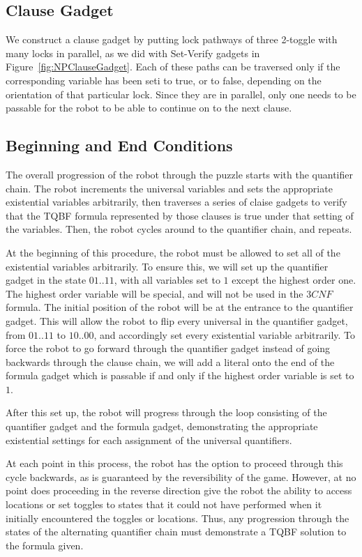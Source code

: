 \subsection{Clause Gadget}
We construct a clause gadget by putting lock pathways of three 2-toggle with many locks in parallel, as we did with Set-Verify gadgets in Figure~\ref{fig:NPClauseGadget}. Each of these paths can be traversed only if the corresponding variable has been seti to true, or to false, depending on the orientation of that particular lock. Since they are in parallel, only one needs to be passable for the robot to be able to continue on to the next clause.

\subsection{Beginning and End Conditions}
The overall progression of the robot through the puzzle starts with the quantifier chain.
The robot increments the universal variables and sets the appropriate existential variables arbitrarily, 
then traverses a series of claise gadgets to verify that the TQBF formula represented by those clauses 
is true under that setting of the variables. Then, the robot cycles around to the quantifier chain, and repeats.

At the beginning of this procedure, the robot must be allowed to set all of the existential variables arbitrarily.
To ensure this, we will set up the quantifier gadget in the state $01 .. 11$, with all variables set to $1$
except the highest order one.  The highest order variable will be special, and will not be used in the $3CNF$
formula. The initial position of the robot will be at the entrance to the quantifier gadget. This will allow
the robot to flip every universal in the quantifier gadget, from $01 .. 11$ to $10 .. 00$, and accordingly
set every existential variable arbitrarily. To force the robot to go forward through the quantifier gadget
instead of going backwards through the clause chain, we will add a literal onto the end of the formula gadget
which is passable if and only if the highest order variable is set to $1$.

After this set up, the robot will progress through the loop consisting of the quantifier gadget and the
formula gadget, demonstrating the appropriate existential settings for each assignment of the universal
quantifiers.

At each point in this process, the robot has the option to proceed through this cycle backwards, as is
guaranteed by the reversibility of the game. However, at no point does proceeding in the reverse direction
give the robot the ability to access locations or set toggles to states that it could not have performed
when it initially encountered the toggles or locations. Thus, any progression through the states of the
alternating quantifier chain must demonstrate a TQBF solution to the formula given.

